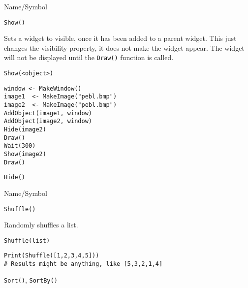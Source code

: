\rl


\begin{desc}{Name/Symbol}
\item[Name/Symbol]  	\verb+Show()+

\item[Description] Sets a widget to visible, once it has been added to
  a parent widget.  This just changes the visibility property, it does
  not make the widget appear.  The widget will not be displayed until
  the \verb+Draw()+ function is called.

\item[Usage]
\begin{verbatim}
Show(<object>)
\end{verbatim}

\item[Example]
\begin{verbatim}
window <- MakeWindow()
image1  <- MakeImage("pebl.bmp")
image2  <- MakeImage("pebl.bmp")
AddObject(image1, window)
AddObject(image2, window)
Hide(image2)
Draw()
Wait(300)
Show(image2)
Draw()
\end{verbatim}

\item[See Also]     	\verb+Hide()+
\end{desc}

\rl




\begin{desc}{Name/Symbol}
\item[Name/Symbol] 	\verb+Shuffle()+

\item[Description] 	Randomly shuffles a list.

\item[Usage]    
\begin{verbatim}
Shuffle(list)
\end{verbatim}

\item[Example]
\begin{verbatim}
Print(Shuffle([1,2,3,4,5]))
# Results might be anything, like [5,3,2,1,4]
\end{verbatim}

\item[See Also]    	\verb+Sort()+, \verb+SortBy()+
\end{desc}

\rl


